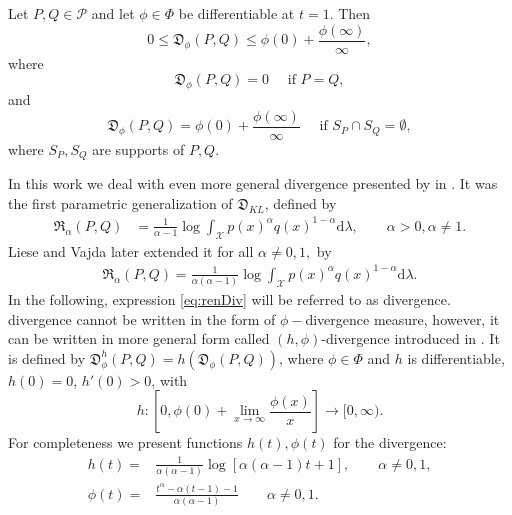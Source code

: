 \begin{theorem}
Let $P,Q \in \mathcal{P}$ and let $\phi \in \Phi$ be differentiable at $t = 1$. Then
\begin{equation}
0 \leq \mathfrak{D}_\phi (P,Q) \leq \phi(0) + \frac{\phi(\infty)}{\infty},
\end{equation}
where
\begin{equation}
 \mathfrak{D}_\phi (P,Q) = 0 \quad \text{ if } P=Q, 
\end{equation}
and
\begin{equation}
\mathfrak{D}_\phi (P,Q) = \phi(0) + \frac{\phi(\infty)}{\infty} \quad \text{ if } S_P \cap S_Q = \emptyset,
\end{equation}
where $S_P, S_Q$  are supports of $P,Q$.
\end{theorem}



In this work we deal with even more general divergence presented by \ren in \cite{Renyi1961}. It was the first parametric generalization of $\mathfrak{D}_{KL}$, defined by
\begin{align*}
\mathfrak{R}_\alpha(P,Q) & = \frac{1}{\alpha-1} \log\int_\mathcal{X} p(x)^\alpha q(x)^{1-\alpha}\mathrm{d}\lambda , \qquad \alpha >0, \alpha \neq 1.
\end{align*}
Liese and Vajda \cite{LieseVajda1987} later extended it for all $\alpha \neq 0,1,$ by
\begin{equation}
\begin{aligned}
\mathfrak{R}_\alpha(P,Q)  = \frac{1}{\alpha(\alpha-1)} \log\int_\mathcal{X} p(x)^\alpha q(x)^{1-\alpha}\mathrm{d}\lambda.%
\label{eq:renDiv}
\end{aligned}
\end{equation}
In the following, expression \eqref{eq:renDiv} will be referred to as \ren divergence.
\ren divergence cannot be written in the form of $\phi-$divergence measure, however, it can be written in more general form called $(h,\phi)$-divergence introduced  in \cite{Menendez1995}. It is defined by  $\mathfrak{D}_\phi^h(P,Q) = h( \mathfrak{D}_{\phi}(P,Q))$, where  $\phi \in \Phi$ and $ h$ is differentiable, $h(0) = 0$, $h' (0) > 0 $, with  \[h : \left[0,\phi(0) + \lim_{x\rightarrow \infty} \frac{\phi(x)}{x} \right] \rightarrow [0,\infty).\] For completeness we present functions $h(t), \phi(t)$ for the \ren divergence:
\begin{align*}
h(t) = & \frac{1}{\alpha(\alpha-1)} \log\left[ \alpha(\alpha - 1)t + 1\right], \qquad \alpha \neq 0,1, \\
\phi(t) = & \frac{t^\alpha - \alpha(t-1) -1}{\alpha(\alpha -1)} \qquad \alpha \neq 0,1.
\end{align*}


